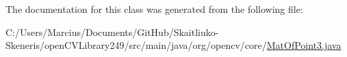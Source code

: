 The documentation for this class was generated from the following file\+:\begin{DoxyCompactItemize}
\item 
C\+:/\+Users/\+Marcius/\+Documents/\+Git\+Hub/\+Skaitliuko-\/\+Skeneris/open\+C\+V\+Library249/src/main/java/org/opencv/core/\mbox{\hyperlink{_mat_of_point3_8java}{Mat\+Of\+Point3.\+java}}\end{DoxyCompactItemize}
